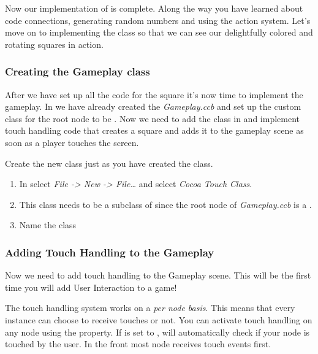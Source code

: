 Now our implementation of  is complete. Along the way you
have learned about code connections, generating random numbers and using the
action system. Let's move on to implementing the  class so
that we can see our delightfully colored and rotating squares in action.

\subsubsection{Creating the Gameplay class}

After we have set up all the code for the square it's now time to implement the
gameplay. In \SB{} we have already created the \ccbfile{} \textit{Gameplay.ccb}
and set up the custom class for the root node to be . Now we need to add the
 class in \xcode{} and implement touch handling code that
creates a square and adds it to the gameplay scene as soon as a player touches
the screen.

\begin{leftbar}
Create the new class just as you have created the  class. 
\begin{enumerate}
  \item In \xcode{} select \textit{File -> New -> File\ldots} and select
\textit{Cocoa Touch Class}.
\item This class needs to be a subclass of
\ccnode{} since the root node of \textit{Gameplay.ccb} is a \ccnode{}.
\item Name the class 
\end{enumerate}
\end{leftbar}

\subsubsection{Adding Touch Handling to the
Gameplay}\label{Introduction_FirstTouchHandling} Now we need to add touch
handling to the Gameplay scene. This will be the first time you will add User Interaction to a \cocos{} game! 

The \cocos{} touch handling system works on a \textit{per node
basis}.
This means that every \ccnode{} instance can choose to receive touches or not. You
can activate touch handling on any node using the
 property. If
 is set to , \cocos{} will
automatically check if your node is touched by the user. In \cocos{} the front
most node receives touch events first.

